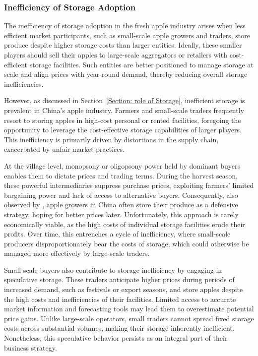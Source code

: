 \subsubsection{Inefficiency of Storage Adoption}
The inefficiency of storage adoption in the fresh apple industry arises when less efficient market participants, such as small-scale apple growers and traders, store produce despite higher storage costs than larger entities. Ideally, these smaller players should sell their apples to large-scale aggregators or retailers with cost-efficient storage facilities. Such entities are better positioned to manage storage at scale and align prices with year-round demand, thereby reducing overall storage inefficiencies.

However, as discussed in Section~\ref{Section: role of Storage}, inefficient storage is prevalent in China's apple industry. Farmers and small-scale traders frequently resort to storing apples in high-cost personal or rented facilities, foregoing the opportunity to leverage the cost-effective storage capabilities of larger players. This inefficiency is primarily driven by distortions in the supply chain, exacerbated by unfair market practices.

At the village level, monopsony or oligopsony power held by dominant buyers enables them to dictate prices and trading terms. During the harvest season, these powerful intermediaries suppress purchase prices, exploiting farmers’ limited bargaining power and lack of access to alternative buyers. Consequently, also observed by \cite{jin2024losses}, apple growers in China often store their produce as a defensive strategy, hoping for better prices later. Unfortunately, this approach is rarely economically viable, as the high costs of individual storage facilities erode their profits. Over time, this entrenches a cycle of inefficiency, where small-scale producers disproportionately bear the costs of storage, which could otherwise be managed more effectively by large-scale traders.

Small-scale buyers also contribute to storage inefficiency by engaging in speculative storage. These traders anticipate higher prices during periods of increased demand, such as festivals or export seasons, and store apples despite the high costs and inefficiencies of their facilities. Limited access to accurate market information and forecasting tools may lead them to overestimate potential price gains. Unlike large-scale operators, small traders cannot spread fixed storage costs across substantial volumes, making their storage inherently inefficient. Nonetheless, this speculative behavior persists as an integral part of their business strategy.

